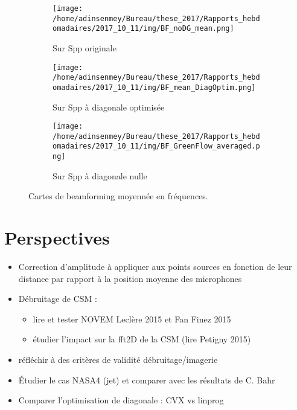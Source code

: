 \documentclass[twocolumn, 12pt, landscape]{article}
\begin{document}
\begin{figure*}[h]
	\begin{subfigure}[]{0.3\textwidth}
		\texttt{[image: /home/adinsenmey/Bureau/these\_2017/Rapports\_hebdomadaires/2017\_10\_11/img/BF\_noDG\_mean.png]}
		\caption{Sur Spp originale}
	\end{subfigure}
	\begin{subfigure}[]{0.3\textwidth}
		\texttt{[image: /home/adinsenmey/Bureau/these\_2017/Rapports\_hebdomadaires/2017\_10\_11/img/BF\_mean\_DiagOptim.png]}
		\caption{Sur Spp à diagonale optimisée}
	\end{subfigure}
	\begin{subfigure}[]{0.3\textwidth}
		\texttt{[image: /home/adinsenmey/Bureau/these\_2017/Rapports\_hebdomadaires/2017\_10\_11/img/BF\_GreenFlow\_averaged.png]}
		\caption{Sur Spp à diagonale nulle}
	\end{subfigure}
	\caption{Cartes de beamforming moyennée en fréquences.}
\end{figure*}


\section{Perspectives}
\noindent\begin{minipage}{\columnwidth}
	\begin{itemize}
	\item Correction d'amplitude à appliquer aux points sources en fonction de leur distance par rapport à la position moyenne des microphones
	\item Débruitage de CSM : 
	\begin{itemize}
		\item lire et tester NOVEM Leclère 2015 et Fan Finez 2015
		\item étudier l'impact sur la fft2D de la CSM (lire Petigny 2015)		
\end{itemize}
	\item réfléchir à des critères de validité débruitage/imagerie
	\item Étudier le cas NASA4 (jet) et comparer avec les résultats de C. Bahr
	\item Comparer l'optimisation de diagonale : CVX vs linprog
\end{itemize}
\end{minipage}
\end{document}
